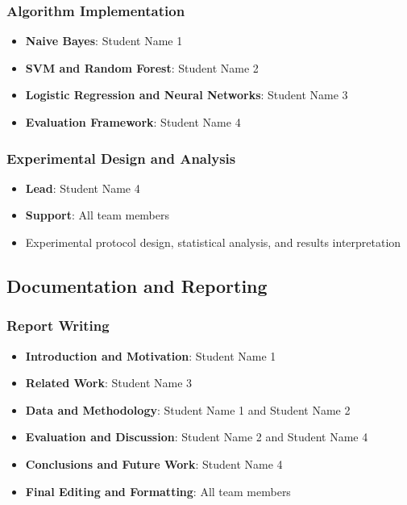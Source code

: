 \documentclass[11pt,a4paper]{article}
\begin{document}
\subsubsection{Algorithm Implementation}
\begin{itemize}
    \item \textbf{Naive Bayes}: Student Name 1
    \item \textbf{SVM and Random Forest}: Student Name 2
    \item \textbf{Logistic Regression and Neural Networks}: Student Name 3
    \item \textbf{Evaluation Framework}: Student Name 4
\end{itemize}

\subsubsection{Experimental Design and Analysis}
\begin{itemize}
    \item \textbf{Lead}: Student Name 4
    \item \textbf{Support}: All team members
    \item Experimental protocol design, statistical analysis, and results interpretation
\end{itemize}

\subsection{Documentation and Reporting}

\subsubsection{Report Writing}
\begin{itemize}
    \item \textbf{Introduction and Motivation}: Student Name 1
    \item \textbf{Related Work}: Student Name 3
    \item \textbf{Data and Methodology}: Student Name 1 and Student Name 2
    \item \textbf{Evaluation and Discussion}: Student Name 2 and Student Name 4
    \item \textbf{Conclusions and Future Work}: Student Name 4
    \item \textbf{Final Editing and Formatting}: All team members
\end{itemize}
\end{document}
